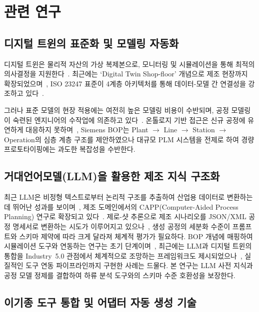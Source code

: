 \documentclass[conference]{IEEEtran}
\begin{document}
\section{관련 연구}

\subsection{디지털 트윈의 표준화 및 모델링 자동화}

디지털 트윈은 물리적 자산의 가상 복제본으로, 모니터링 및 시뮬레이션을 통해 최적의 의사결정을 지원한다~\cite{b1}. 최근에는 `Digital Twin Shop-floor' 개념으로 제조 현장까지 확장되었으며~\cite{b2}, ISO 23247 표준이 4계층 아키텍처를 통해 데이터-모델 간 연결성을 강조하고 있다~\cite{b3}.

그러나 표준 모델의 현장 적용에는 여전히 높은 모델링 비용이 수반되며, 공정 모델링이 숙련된 엔지니어의 수작업에 의존하고 있다~\cite{b4}. 온톨로지 기반 접근은 신규 공정에 유연하게 대응하지 못하며~\cite{b5}, Siemens BOP는 Plant $\rightarrow$ Line $\rightarrow$ Station $\rightarrow$ Operation의 심층 계층 구조를 제안하였으나 대규모 PLM 시스템을 전제로 하여 경량 프로토타이핑에는 과도한 복잡성을 수반한다.

\subsection{거대언어모델(LLM)을 활용한 제조 지식 구조화}

최근 LLM은 비정형 텍스트로부터 논리적 구조를 추출하여 산업용 데이터로 변환하는 데 뛰어난 성과를 보이며~\cite{b6}, 제조 도메인에서의 CAPP(Computer-Aided Process Planning) 연구로 확장되고 있다~\cite{b7}. 제로-샷 추론으로 제조 시나리오를 JSON/XML 공정 명세서로 변환하는 시도가 이루어지고 있으나~\cite{b8}, 생성 공정의 세분화 수준이 프롬프트와 스키마 제약에 따라 크게 달라져 체계적 평가가 필요하다. BOP 개념에 매핑하여 시뮬레이션 도구와 연동하는 연구는 초기 단계이며~\cite{b9}, 최근에는 LLM과 디지털 트윈의 통합을 Industry~5.0 관점에서 체계적으로 조망하는 프레임워크도 제시되었으나~\cite{b16}, 실질적인 도구 연동 파이프라인까지 구현한 사례는 드물다. 본 연구는 LLM 사전 지식과 공정 모델 정제를 결합하여 하류 분석 도구와의 스키마 수준 호환성을 보장한다.

\subsection{이기종 도구 통합 및 어댑터 자동 생성 기술}
\end{document}

